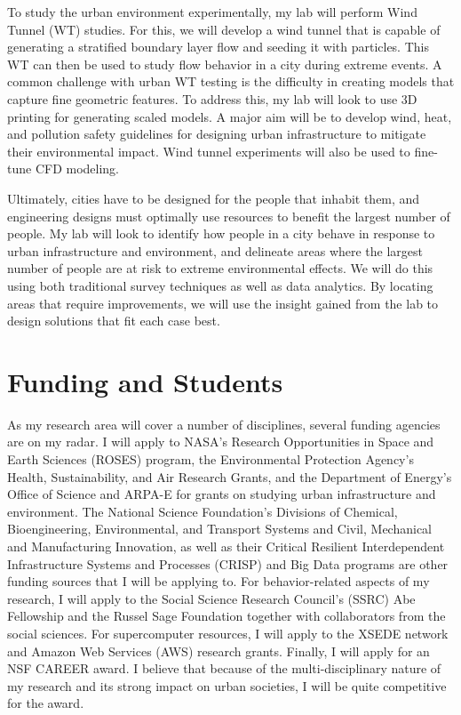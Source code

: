 \documentclass[12pt]{article}
\begin{document}
To study the urban environment experimentally, my lab will perform Wind Tunnel (WT) studies. For this, we will develop a wind tunnel that is capable of generating a stratified boundary layer flow and seeding it with particles. This WT can then be used to study flow behavior in a city during extreme events. A common challenge with urban WT testing is the difficulty in creating models that capture fine geometric features. To address this, my lab will look to use 3D printing for generating scaled models. A major aim will be to develop wind, heat, and pollution safety guidelines for designing urban infrastructure to mitigate their environmental impact. Wind tunnel experiments will also be used to fine-tune CFD modeling. 

Ultimately, cities have to be designed for the people that inhabit them, and engineering designs must optimally use resources to benefit the largest number of people. My lab will look to identify how people in a city behave in response to urban infrastructure and environment, and delineate areas where the largest number of people are at risk to extreme environmental effects. We will do this using both traditional survey techniques as well as data analytics. By locating areas that require improvements, we will use the insight gained from the lab to design solutions that fit each case best. 

\section*{Funding and Students}
As my research area will cover a number of disciplines, several funding agencies are on my radar. I will apply to NASA's Research Opportunities in Space and Earth Sciences (ROSES) program, the Environmental Protection Agency's Health, Sustainability, and Air Research Grants, and the Department of Energy's Office of Science and ARPA-E for grants on studying urban infrastructure and environment. The National Science Foundation's Divisions of Chemical, Bioengineering, Environmental, and Transport Systems and Civil, Mechanical and Manufacturing Innovation, as well as their Critical Resilient Interdependent Infrastructure Systems and Processes (CRISP) and Big Data programs are other funding sources that I will be applying to. For behavior-related aspects of my research, I will apply to the Social Science Research Council's (SSRC) Abe Fellowship and the Russel Sage Foundation together with collaborators from the social sciences. For supercomputer resources, I will apply to the XSEDE network and Amazon Web Services (AWS) research grants. Finally, I will apply for an NSF CAREER award. I believe that because of the multi-disciplinary nature of my research and its strong impact on urban societies, I will be quite competitive for the award. 
\end{document}
